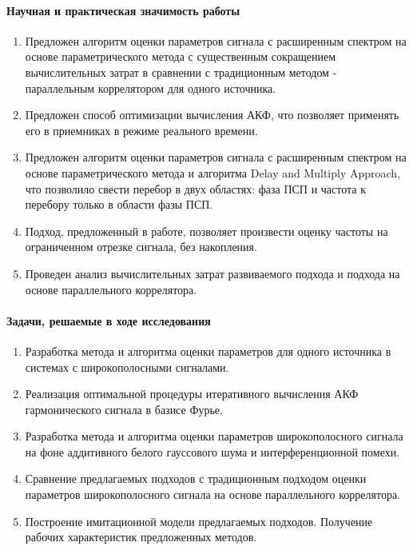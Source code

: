 \paragraph{Научная и практическая значимость работы}
\begin{enumerate}
	\item {Предложен алгоритм оценки параметров сигнала с расширенным спектром на основе параметрического метода с существенным
		сокращением вычислительных затрат в сравнении с традиционным методом - параллельным коррелятором для одного источника.}
	\item {Предложен способ оптимизации вычисления АКФ, что позволяет применять его в приемниках в режиме реального времени.}
	\item {Предложен алгоритм оценки параметров сигнала с расширенным спектром на основе параметрического метода и алгоритма Delay and Multiply Approach,
		что позволило свести перебор в двух областях: фаза ПСП и частота к перебору только в области фазы ПСП.}
	\item {Подход, предложенный в работе, позволяет произвести оценку частоты на ограниченном отрезке сигнала, без накопления.}
	\item {Проведен анализ вычислительных затрат развиваемого подхода и подхода на основе параллельного коррелятора.}
\end{enumerate}

\paragraph{Задачи, решаемые в ходе исследования}
\begin{enumerate}
	\item {Разработка метода и алгоритма оценки параметров для одного источника в системах с широкополосными сигналами.}
	\item {Реализация оптимальной процедуры итеративного вычисления АКФ гармонического сигнала в базисе Фурье.}
	\item {Разработка метода и алгоритма оценки параметров широкополосного сигнала на фоне аддитивного белого гауссового шума и
		интерференционной помехи.}
	\item {Сравнение предлагаемых подходов с традиционным подходом оценки параметров широкополосного сигнала на основе параллельного коррелятора.}
	\item {Построение имитационной модели предлагаемых подходов. Получение рабочих характеристик предложенных методов.}
\end{enumerate}

